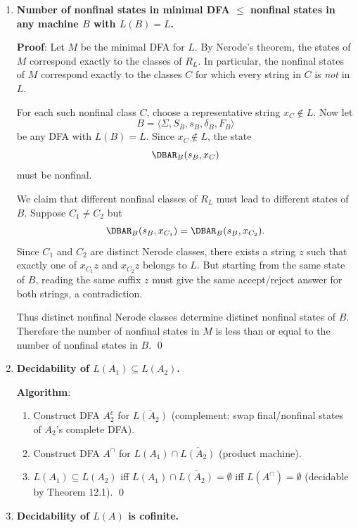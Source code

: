 \begin{enumerate}[{12.}1. ]
Therefore $|x_m|<2n$. \qed

\item \textbf{Number of nonfinal states in minimal DFA $\leq$ nonfinal states in any machine $B$ with $L(B)=L$.}

\textbf{Proof}: Let $M$ be the minimal DFA for $L$. By Nerode's theorem, the
states of $M$ correspond exactly to the classes of $R_L$. In particular, the
nonfinal states of $M$ correspond exactly to the classes $C$ for which every
string in $C$ is \emph{not} in $L$.

For each such nonfinal class $C$, choose a representative string $x_C\notin L$.
Now let
\[
B=\langle \Sigma,S_B,s_B,\delta_B,F_B\rangle
\]
be any DFA with $L(B)=L$. Since $x_C\notin L$, the state
\[
\DBAR_B(s_B,x_C)
\]
must be nonfinal.

We claim that different nonfinal classes of $R_L$ must lead to different states
of $B$. Suppose $C_1\neq C_2$ but
\[
\DBAR_B(s_B,x_{C_1})=\DBAR_B(s_B,x_{C_2}).
\]
Since $C_1$ and $C_2$ are distinct Nerode classes, there exists a string $z$
such that exactly one of $x_{C_1}z$ and $x_{C_2}z$ belongs to $L$. But starting
from the same state of $B$, reading the same suffix $z$ must give the same
accept/reject answer for both strings, a contradiction.

Thus distinct nonfinal Nerode classes determine distinct nonfinal states of
$B$. Therefore the number of nonfinal states in $M$ is less than or equal to the
number of nonfinal states in $B$. \qed

\item \textbf{Decidability of $L(A_1)\subseteq L(A_2)$.}

\textbf{Algorithm}:
\begin{enumerate}
\item Construct DFA $A_2^c$ for $\overline{L(A_2)}$ (complement: swap final/nonfinal states of $A_2$'s complete DFA).
\item Construct DFA $A^\cap$ for $L(A_1)\cap\overline{L(A_2)}$ (product machine).
\item $L(A_1)\subseteq L(A_2)$ iff $L(A_1)\cap\overline{L(A_2)}=\emptyset$ iff $L(A^\cap)=\emptyset$ (decidable by Theorem 12.1). \qed
\end{enumerate}

\item \textbf{Decidability of $L(A)$ is cofinite.}


\end{enumerate}
